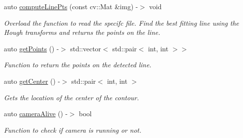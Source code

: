 \begin{DoxyCompactItemize}
auto \hyperlink{class_perception_module_a10108f98beff5d686826d52d787c7a63}{compute\+Line\+Pts} (const cv\+::\+Mat \&img) -\/$>$ void
\begin{DoxyCompactList}\small\item\em Overload the function to read the specifc file. Find the best fitting line using the Hough transforms and returns the points on the line. \end{DoxyCompactList}\item 
auto \hyperlink{class_perception_module_a4479a449ea05c5490a47224767a864cc}{get\+Points} () -\/$>$ std\+::vector$<$ std\+::pair$<$ int, int $>$$>$
\begin{DoxyCompactList}\small\item\em Function to return the points on the detected line. \end{DoxyCompactList}\item 
auto \hyperlink{class_perception_module_ab39e9908fda8dd1b582b33a2f1ee0638}{get\+Center} () -\/$>$ std\+::pair$<$ int, int $>$
\begin{DoxyCompactList}\small\item\em Gets the location of the center of the contour. \end{DoxyCompactList}\item 
auto \hyperlink{class_perception_module_a034e0b3191be67f571aa284e0c30f749}{camera\+Alive} () -\/$>$ bool
\begin{DoxyCompactList}\small\item\em Function to check if camera is running or not. \end{DoxyCompactList}\end{DoxyCompactItemize}
